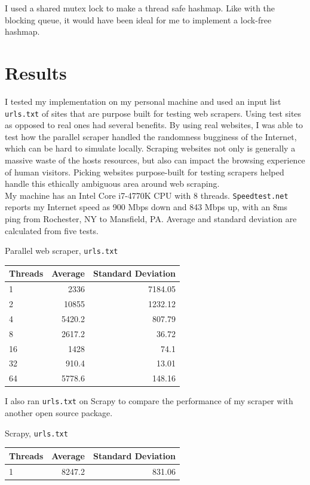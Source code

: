 \documentclass[11pt]{article}
\begin{document}
I used a shared mutex lock to make a thread safe hashmap. Like with the blocking queue, it would have been ideal for me to implement a lock-free hashmap.

\section{Results}

I tested my implementation on my personal machine and used an input list \texttt{urls.txt} of sites that are purpose built for testing web scrapers. Using test sites as opposed to real ones had several benefits. By using real websites, I was able to test how the parallel scraper handled the randomness bugginess of the Internet, which can be hard to simulate locally. Scraping websites not only is generally a massive waste of the hosts resources, but also can impact the browsing experience of human visitors. Picking websites purpose-built for testing scrapers helped handle this ethically ambiguous area around web scraping. \\

My machine has an Intel Core i7-4770K CPU with 8 threads. \texttt{Speedtest.net} reports my Internet speed as 900 Mbps down and 843 Mbps up, with an 8ms ping from Rochester, NY to Mansfield, PA. Average and standard deviation are calculated from five tests. 

\begin{center}
Parallel web scraper, \texttt{urls.txt} \\
\begin{tabular}{l|r|r}
Threads & Average & Standard Deviation \\
\hline
1 & 2336 & 7184.05 \\
2 & 10855 & 1232.12 \\
4 & 5420.2 & 807.79 \\
8 & 2617.2 & 36.72 \\
16 & 1428 & 74.1 \\
32 & 910.4 & 13.01 \\
64 & 5778.6 & 148.16 \\
\end{tabular}
\end{center}

I also ran \texttt{urls.txt} on Scrapy to compare the performance of my scraper with another open source package.

\begin{center}
Scrapy, \texttt{urls.txt} \\
\begin{tabular}{l|r|r}
Threads & Average & Standard Deviation \\
\hline
1 & 8247.2 & 831.06 \\
\end{tabular}
\end{center}
\end{document}
